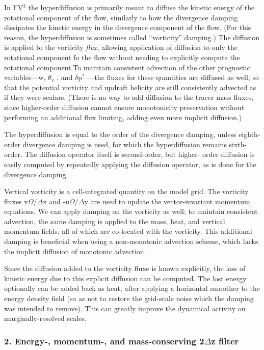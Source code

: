 In F\-V$^{\mbox{3}}$  the hyperdiffusion is primarily meant to diffuse the kinetic energy of the rotational component of the flow, similarly to how the divergence damping dissipates the kinetic energy in the divergence component of the flow. (For this reason, the hyperdiffusion is sometimes called “vorticity” damping.) The diffusion is applied to the vorticity {\itshape flux}, allowing application of diffusion to only the rotational component fo the flow without needing to explicitly compute the rotational component.\-To maintain consistent advection of the other prognostic variables—w, {$\theta$}$_{\mbox{v}}$ , and {$\delta$}p$^{\mbox{$\ast$}}$ —the fluxes for these quantities are diffused as well, so that the potential vorticity and updraft helicity are still consistently advected as if they were scalars. (There is no way to add diffusion to the tracer mass fluxes, since higher-\/order diffusion cannot ensure monotonicity preservation without performing an additional flux limiting, adding even more implicit diffusion.)

The hyperdiffusion is equal to the order of the divergence damping, unless eighth-\/order divergence damping is used, for which the hyperdiffusion remains sixth-\/order. The diffusion operator itself is second-\/order, but higher-\/ order diffusion is easily computed by repeatedly applying the diffusion operator, as is done for the divergence damping.

Vertical vorticity is a cell-\/integrated quantity on the model grid. The vorticity fluxes v{$\Omega$}/{$\Delta$}x and -\/u{$\Omega$}/{$\Delta$}y are used to update the vector-\/invariant momentum equations. We can apply damping on the vorticity as well; to maintain consistent advection, the same damping is applied to the mass, heat, and vertical momentum fields, all of which are co-\/located with the vorticity. This additional damping is beneficial when using a non-\/monotonic advection scheme, which lacks the implicit diffusion of monotonic advection.

Since the diffusion added to the vorticity fluxe is known explicitly, the loss of kinetic energy due to this explicit diffusion can be computed. The lost energy optionally can be added back as heat, after applying a horizontal smoother to the energy density field (so as not to restore the grid-\/scale noise which the damping was intended to remove). This can greatly improve the dynamical activity on marginally-\/resolved scales.

\subsubsection*{2. Energy-\/, momentum-\/, and mass-\/conserving 2{$\Delta$}z filter}

